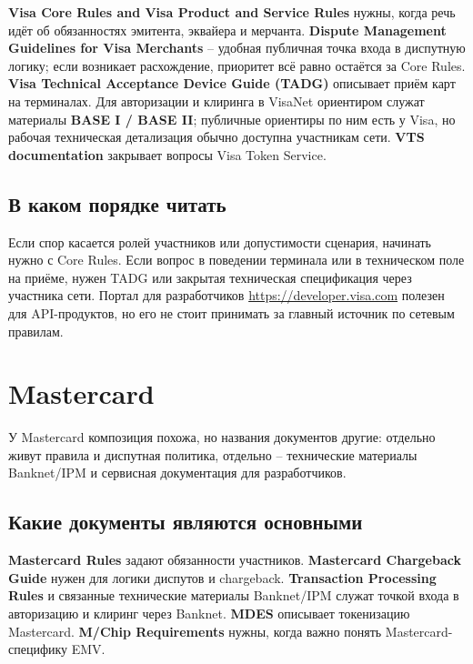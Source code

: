 \textbf{Visa Core Rules and Visa Product and Service Rules}
нужны, когда речь идёт об обязанностях эмитента, эквайера
и мерчанта. \textbf{Dispute Management Guidelines for Visa Merchants}
-- удобная публичная точка входа в диспутную логику; если
возникает расхождение, приоритет всё равно остаётся за Core Rules.
\textbf{Visa Technical Acceptance Device Guide (TADG)}
описывает приём карт на терминалах. Для авторизации и клиринга
в VisaNet ориентиром служат материалы \textbf{BASE I / BASE II};
публичные ориентиры по ним есть у Visa, но рабочая техническая
детализация обычно доступна участникам сети.
\textbf{VTS documentation} закрывает вопросы Visa Token Service.





\subsection*{В каком порядке читать}

Если спор касается ролей участников или допустимости сценария,
начинать нужно с Core Rules. Если вопрос в поведении терминала
или в техническом поле на приёме, нужен TADG или закрытая
техническая спецификация через участника сети. Портал
для разработчиков \url{https://developer.visa.com} полезен
для API-продуктов, но его не стоит принимать за главный источник
по сетевым правилам.

\section{Mastercard}
\label{sec:ps-mastercard}

У Mastercard композиция похожа, но названия документов
другие: отдельно живут правила и диспутная политика, отдельно --
технические материалы Banknet/IPM и сервисная документация
для разработчиков.

\subsection*{Какие документы являются основными}

\textbf{Mastercard Rules} задают обязанности участников.
\textbf{Mastercard Chargeback Guide} нужен для логики диспутов
и chargeback. \textbf{Transaction Processing Rules}
и связанные технические материалы Banknet/IPM служат точкой
входа в авторизацию и клиринг через Banknet.
\textbf{MDES} описывает токенизацию Mastercard.
\textbf{M/Chip Requirements} нужны, когда важно понять
Mastercard-специфику EMV.

